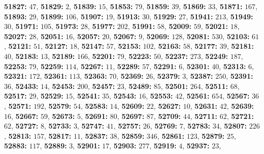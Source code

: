 \textsf{\bfseries 51827:} $47$, \textsf{\bfseries 51829:} $2$, \textsf{\bfseries 51839:} $15$, \textsf{\bfseries 51853:} $79$, \textsf{\bfseries 51859:} $39$, \textsf{\bfseries 51869:} $33$, \textsf{\bfseries 51871:} $167$, \textsf{\bfseries 51893:} $29$, \textsf{\bfseries 51899:} $106$, \textsf{\bfseries 51907:} $19$, \textsf{\bfseries 51913:} $30$, \textsf{\bfseries 51929:} $27$, \textsf{\bfseries 51941:} $213$, \textsf{\bfseries 51949:} $30$, \textsf{\bfseries 51971:} $105$, \textsf{\bfseries 51973:} $28$, \textsf{\bfseries 51977:} $202$, \textsf{\bfseries 51991:} $58$, \textsf{\bfseries 52009:} $59$, \textsf{\bfseries 52021:} $18$, \textsf{\bfseries 52027:} $28$, \textsf{\bfseries 52051:} $16$, \textsf{\bfseries 52057:} $20$, \textsf{\bfseries 52067:} $9$, \textsf{\bfseries 52069:} $128$, \textsf{\bfseries 52081:} $530$, \textsf{\bfseries 52103:} $61$, \textsf{\bfseries 52121:} $51$, \textsf{\bfseries 52127:} $18$, \textsf{\bfseries 52147:} $57$, \textsf{\bfseries 52153:} $102$, \textsf{\bfseries 52163:} $58$, \textsf{\bfseries 52177:} $39$, \textsf{\bfseries 52181:} $40$, \textsf{\bfseries 52183:} $13$, \textsf{\bfseries 52189:} $166$, \textsf{\bfseries 52201:} $79$, \textsf{\bfseries 52223:} $50$, \textsf{\bfseries 52237:} $273$, \textsf{\bfseries 52249:} $187$, \textsf{\bfseries 52253:} $79$, \textsf{\bfseries 52259:} $114$, \textsf{\bfseries 52267:} $11$, \textsf{\bfseries 52289:} $57$, \textsf{\bfseries 52291:} $6$, \textsf{\bfseries 52301:} $40$, \textsf{\bfseries 52313:} $6$, \textsf{\bfseries 52321:} $172$, \textsf{\bfseries 52361:} $113$, \textsf{\bfseries 52363:} $70$, \textsf{\bfseries 52369:} $26$, \textsf{\bfseries 52379:} $3$, \textsf{\bfseries 52387:} $250$, \textsf{\bfseries 52391:} $36$, \textsf{\bfseries 52433:} $14$, \textsf{\bfseries 52453:} $200$, \textsf{\bfseries 52457:} $23$, \textsf{\bfseries 52489:} $85$, \textsf{\bfseries 52501:} $264$, \textsf{\bfseries 52511:} $68$, \textsf{\bfseries 52517:} $29$, \textsf{\bfseries 52529:} $15$, \textsf{\bfseries 52541:} $35$, \textsf{\bfseries 52543:} $16$, \textsf{\bfseries 52553:} $42$, \textsf{\bfseries 52561:} $654$, \textsf{\bfseries 52567:} $36$, \textsf{\bfseries 52571:} $192$, \textsf{\bfseries 52579:} $54$, \textsf{\bfseries 52583:} $14$, \textsf{\bfseries 52609:} $22$, \textsf{\bfseries 52627:} $10$, \textsf{\bfseries 52631:} $42$, \textsf{\bfseries 52639:} $16$, \textsf{\bfseries 52667:} $59$, \textsf{\bfseries 52673:} $5$, \textsf{\bfseries 52691:} $80$, \textsf{\bfseries 52697:} $87$, \textsf{\bfseries 52709:} $44$, \textsf{\bfseries 52711:} $62$, \textsf{\bfseries 52721:} $62$, \textsf{\bfseries 52727:} $8$, \textsf{\bfseries 52733:} $3$, \textsf{\bfseries 52747:} $41$, \textsf{\bfseries 52757:} $26$, \textsf{\bfseries 52769:} $7$, \textsf{\bfseries 52783:} $34$, \textsf{\bfseries 52807:} $226$, \textsf{\bfseries 52813:} $157$, \textsf{\bfseries 52817:} $11$, \textsf{\bfseries 52837:} $38$, \textsf{\bfseries 52859:} $346$, \textsf{\bfseries 52861:} $123$, \textsf{\bfseries 52879:} $25$, \textsf{\bfseries 52883:} $117$, \textsf{\bfseries 52889:} $3$, \textsf{\bfseries 52901:} $17$, \textsf{\bfseries 52903:} $277$, \textsf{\bfseries 52919:} $4$, \textsf{\bfseries 52937:} $23$, 
